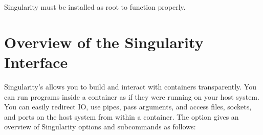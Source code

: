 \documentclass[letterpaper,10pt,english]{sphinxmanual}
\begin{document}
Singularity must be installed as root to function properly.


\section{Overview of the Singularity Interface}
\label{\detokenize{quick_start:overview-of-the-singularity-interface}}
Singularity’s {\hyperref[\detokenize{appendix:command-usage}]{}} allows you to build and interact with containers
transparently. You can run programs inside a container as if they were
running on your host system. You can easily redirect IO, use pipes,
pass arguments, and access files, sockets, and ports on the host
system from within a container.
The  option gives an overview of Singularity options and subcommands as
follows:
\end{document}
